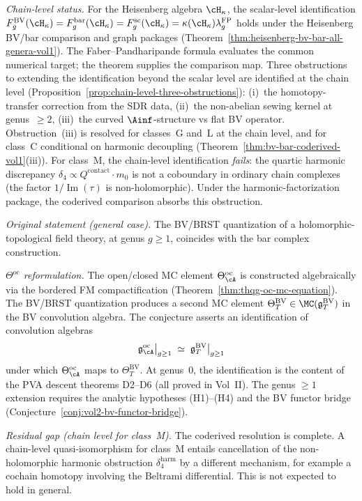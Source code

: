 \begin{enumerate}[label=\textup{(\arabic*)}]
 \smallskip\noindent
 \emph{Chain-level status.}
 For the Heisenberg algebra $\cH_\kappa$, the scalar-level
 identification
	 $F_g^{\mathrm{BV}}(\cH_\kappa)
	 = F_g^{\mathrm{bar}}(\cH_\kappa)
	 = F_g^{\mathrm{sc}}(\cH_\kappa)
	 = \kappa(\cH_\kappa)\lambda_g^{\mathrm{FP}}$
 holds under the Heisenberg BV/bar comparison and graph packages
 (Theorem~\ref{thm:heisenberg-bv-bar-all-genera-vol1}).  The
 Faber--Pandharipande formula evaluates the common numerical target;
 the theorem supplies the comparison map.
 Three obstructions to extending the identification
 beyond the scalar level are identified at the chain level
 (Proposition~\ref{prop:chain-level-three-obstructions}):
 (i)~the homotopy-transfer correction from the SDR data,
 (ii)~the non-abelian sewing kernel at genus~$\geq 2$,
 (iii)~the curved $\Ainf$-structure vs flat BV operator.
 Obstruction~(iii) is resolved for classes~G and~L
 at the chain level, and for class~C conditional on harmonic
 decoupling (Theorem~\ref{thm:bv-bar-coderived-vol1}(iii)).
 For class~M, the chain-level identification \emph{fails}:
 the quartic harmonic discrepancy
 $\delta_4 \propto Q^{\mathrm{contact}} \cdot m_0$ is not a
 coboundary in ordinary chain complexes (the factor
 $1/\operatorname{Im}(\tau)$ is non-holomorphic).
 Under the harmonic-factorization package, the coderived comparison
 absorbs this obstruction.

 \smallskip\noindent
 \emph{Original statement (general case).}
 The BV/BRST quantization of a holomorphic-topological field
 theory, at genus $g \geq 1$, coincides with the bar complex
 construction.

 \smallskip\noindent
 \emph{$\Theta^{\mathrm{oc}}$ reformulation.}
 The open/closed MC element $\Theta^{\mathrm{oc}}_\cA$ is
 constructed algebraically via the bordered FM compactification
 (Theorem~\ref{thm:thqg-oc-mc-equation}). The BV/BRST
 quantization produces a second MC element
 $\Theta^{\mathrm{BV}}_T \in \MC(\mathfrak{g}^{\mathrm{BV}}_T)$
 in the BV convolution algebra. The conjecture asserts an
 identification of convolution algebras
 \[
 \mathfrak{g}^{\mathrm{oc}}_{\cA}\big|_{g \geq 1}
 \;\simeq\;
 \mathfrak{g}^{\mathrm{BV}}_T\big|_{g \geq 1}
 \]
 under which $\Theta^{\mathrm{oc}}_\cA$ maps to
 $\Theta^{\mathrm{BV}}_T$. At genus~$0$, the identification is
 the content of the PVA descent theorems D2--D6 (all proved in
 Vol~II). The genus $\geq 1$ extension requires the analytic
 hypotheses (H1)--(H4) and the BV functor bridge
 (Conjecture~\ref{conj:vol2-bv-functor-bridge}).

 \smallskip\noindent
 \emph{Residual gap (chain level for class~M).}
 The coderived resolution is complete. A chain-level
 quasi-isomorphism for class~M entails cancellation of the
 non-holomorphic harmonic obstruction $\delta_4^{\mathrm{harm}}$
 by a different mechanism, for example a cochain homotopy involving
 the Beltrami differential.
 This is not expected to hold in general.


\end{enumerate}
